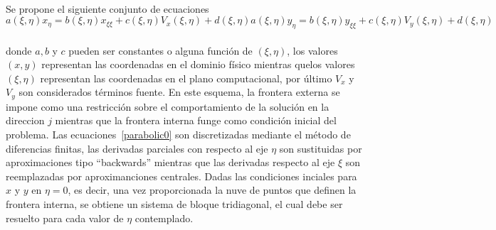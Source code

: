\documentclass[letterpaper, openright, 12pt]{book}
\begin{document}
    \paragraph*{}
    Se propone el siguiente conjunto de ecuaciones
    \begin{subequations}
        \begin{equation}
            a(\xi, \eta) x_\eta = b(\xi, \eta)x_{\xi\xi}
            + c(\xi, \eta)V_x(\xi, \eta) + d(\xi, \eta)
        \end{equation}
        \begin{equation}
            a(\xi, \eta) y_\eta = b(\xi, \eta)y_{\xi\xi}
            + c(\xi, \eta)V_y(\xi, \eta) + d(\xi, \eta)
        \end{equation}
        \label{parabolic0}
    \end{subequations}\\
    donde $a, b$ y $c$ pueden ser constantes o alguna función de
    $(\xi,\eta)$, los valores $(x, y)$ representan las coordenadas en el
    dominio físico mientras quelos valores $(\xi, \eta)$ representan las
    coordenadas en el plano computacional, por último $V_x$ y $V_y$ son
    considerados términos fuente. En este esquema, la frontera externa se
    impone como una restricción sobre el comportamiento de la solución en la
    direccion $j$ mientras que la frontera interna funge como condición
    inicial del problema. Las ecuaciones~\ref{parabolic0} son discretizadas
    mediante el método de diferencias finitas, las derivadas parciales con
    respecto al eje $\eta$ son sustituidas por aproximaciones tipo
    ``backwards'' mientras que las derivadas respecto al eje $\xi$ son
    reemplazadas por aproximanciones centrales. Dadas las condiciones
    inciales para $x$  y $y$ en $\eta = 0$, es decir, una vez proporcionada
    la nuve de puntos que definen la frontera interna, se obtiene un sistema
    de bloque tridiagonal, el cual debe ser resuelto para cada valor de
    $\eta$ contemplado.
\end{document}
